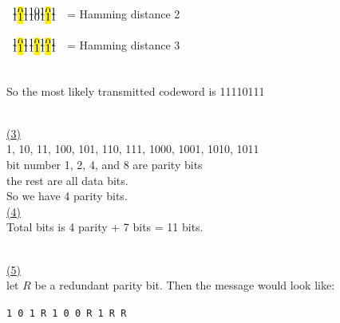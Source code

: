 \documentclass[12pt]{article}
\begin{document}
\begin{minipage}[t]{0.5\textwidth}
	\begin{center}
		$
			\begin{array}{l}
				\text{1\hl{0}1101\hl{0}1} \\[-2.5mm]
				\text{1\hl{1}1101\hl{1}1}
			\end{array}
		$ = Hamming distance 2
	\end{center}
\end{minipage}
\begin{minipage}[t]{0.5\textwidth}
	\begin{center}
		$
			\begin{array}{l}
				\text{1\hl{0}11\hl{0}1\hl{0}1} \\[-2.5mm]
				\text{1\hl{1}11\hl{1}1\hl{1}1}
			\end{array}
		$ = Hamming distance 3
	\end{center}
\end{minipage}\\

So the most likely transmitted codeword is 11110111

~\\\hyperlink{toc}{\hypertarget{6.3}{(3)}}\\
1, 10, 11, 100, 101, 110, 111, 1000, 1001, 1010, 1011\\
bit number 1, 2, 4, and 8 are parity bits\\
the rest are all data bits. \\

So we have 4 parity bits.
~\\\hyperlink{toc}{\hypertarget{6.4}{(4)}}\\
Total bits is 4 parity + 7 bits = 11 bits.

~\\\hyperlink{toc}{\hypertarget{6.5}{(5)}}\\
let $R$ be a redundant parity bit. Then the message would look like:
\begin{center}
	\texttt{1 0 1 R 1 0 0 R 1 R R}
\end{center}
\end{document}
